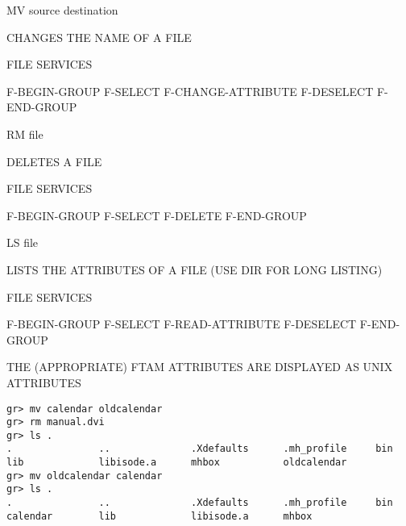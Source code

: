\begin{bwslide}

\begin{nrtc}
\item	MV source destination
    \begin{nrtc}
    \item	CHANGES THE NAME OF A FILE

    \item	FILE SERVICES
	\begin{nrtc}
	\item	F-BEGIN-GROUP F-SELECT F-CHANGE-ATTRIBUTE F-DESELECT
		F-END-GROUP
	\end{nrtc}
    \end{nrtc}

\item	RM file
    \begin{nrtc}
    \item	DELETES A FILE

    \item	FILE SERVICES
	\begin{nrtc}
	\item	F-BEGIN-GROUP F-SELECT F-DELETE F-END-GROUP
	\end{nrtc}
    \end{nrtc}
\end{nrtc}
\end{bwslide}


\begin{bwslide}

\begin{nrtc}
\item	LS file
    \begin{nrtc}
    \item	LISTS THE ATTRIBUTES OF A FILE (USE DIR FOR LONG LISTING)

    \item	FILE SERVICES
	\begin{nrtc}
	\item	F-BEGIN-GROUP F-SELECT F-READ-ATTRIBUTE F-DESELECT F-END-GROUP
	\end{nrtc}

    \item	THE (APPROPRIATE) FTAM ATTRIBUTES ARE DISPLAYED AS UNIX
		ATTRIBUTES
    \end{nrtc}
\end{nrtc}
\end{bwslide}


\begin{bwslide}
\small

\begin{verbatim}
gr> mv calendar oldcalendar
gr> rm manual.dvi
gr> ls .
.               ..              .Xdefaults      .mh_profile     bin
lib             libisode.a      mhbox           oldcalendar
gr> mv oldcalendar calendar
gr> ls .
.               ..              .Xdefaults      .mh_profile     bin
calendar        lib             libisode.a      mhbox
\end{verbatim}
\end{bwslide}


